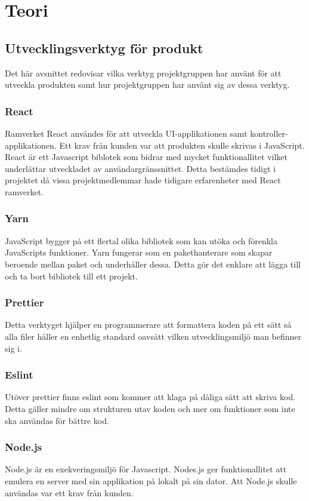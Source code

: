\chapter{Teori}
\label{cha:theory}

\section{Utvecklingsverktyg för produkt}
Det här avsnittet redovisar vilka verktyg projektgruppen har använt för att utveckla produkten samt hur projektgruppen har använt sig av dessa verktyg.

\subsection*{React}
Ramverket React användes för att utveckla UI-applikationen samt kontroller-applikationen. Ett krav från kunden var att produkten skulle skrivas i JavaScript. React är ett Javascript biblotek som bidrar med mycket funktionallitet vilket underlättar utveckladet av användargränssnittet.  Detta bestämdes tidigt i projektet då vissa projektmedlemmar hade tidigare erfarenheter med React ramverket.

\subsection*{Yarn}
JavaScript bygger på ett flertal olika bibliotek som kan utöka och förenkla JavaScripts funktioner. Yarn fungerar som en pakethanterare som skapar beroende mellan paket och underhåller dessa. Detta gör det enklare att lägga till och ta bort bibliotek till ett projekt.

\subsection*{Prettier}
Detta verktyget hjälper en programmerare att formattera koden på ett sätt så alla filer håller en enhetlig standard oavsätt vilken utvecklingsmiljö man befinner sig i.

\subsection*{Eslint}
Utöver prettier finns eslint som kommer att klaga på dåliga sätt att skriva kod. Detta gäller mindre om strukturen utav koden och mer om funktioner som inte ska användas för bättre kod.

\subsection*{Node.js}
Node.js är en exekveringsmiljö för Javascript. Nodes.js ger funktionallitet att emulera en server med sin applikation på lokalt på sin dator. Att Node.js skulle användas var ett krav från kunden.

